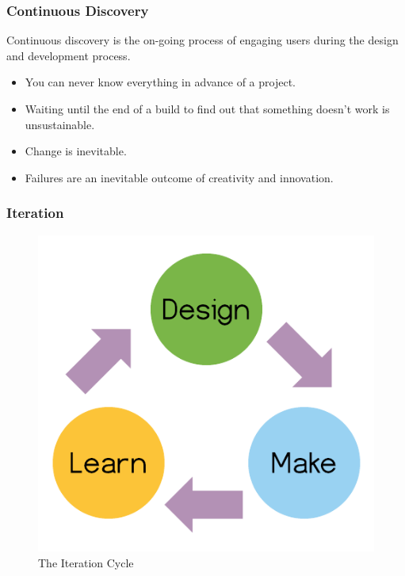 \begin{frame}
	\frametitle{Continuous Discovery}
	Continuous discovery is the on-going process of engaging users during the design and development process. 
	\begin{itemize}
		\item \pause You can never know everything in advance of a project.
		\item \pause Waiting until the end of a build to find out that something doesn't work is unsustainable. 
		\item \pause Change is inevitable.
		\item \pause Failures are an inevitable outcome of creativity and innovation. 
	\end{itemize}
\end{frame}	

\begin{frame}
	\frametitle{Iteration}
	\begin{figure}
		\includegraphics[scale=0.4]{assets/iteration.png}
		\caption{The Iteration Cycle}
	\end{figure}
\end{frame}



